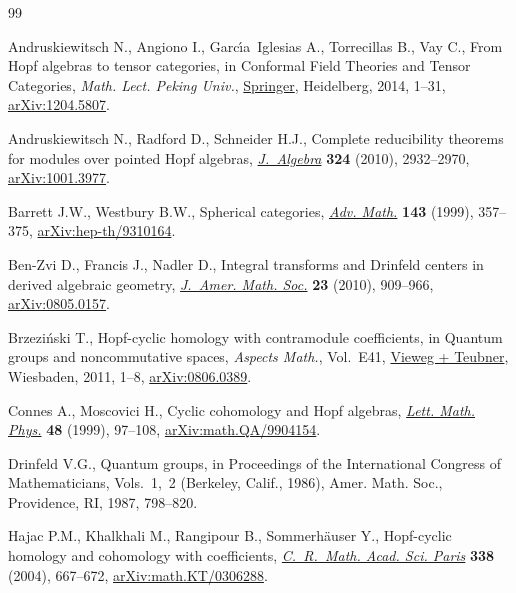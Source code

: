 \begin{thebibliography}{99}
\footnotesize\itemsep=0pt

Andruskiewitsch N., Angiono I., Garc\'{\i}a~Iglesias A., Torrecillas B., Vay
 C., From {H}opf algebras to tensor ca\-te\-gories, in Conformal Field Theories
 and Tensor Categories, \textit{Math. Lect. Peking Univ.}, \href{https://doi.org/10.1007/978-3-642-39383-9_1}{Springer}, Heidelberg, 2014,
 1--31, \href{https://arxiv.org/abs/1204.5807}{arXiv:1204.5807}.

Andruskiewitsch N., Radford D., Schneider H.J., Complete reducibility theorems
 for modules over pointed {H}opf algebras, \href{https://doi.org/10.1016/j.jalgebra.2010.06.002}{\textit{J.~Algebra}} \textbf{324}
 (2010), 2932--2970, \href{https://arxiv.org/abs/1001.3977}{arXiv:1001.3977}.

Barrett J.W., Westbury B.W., Spherical categories, \href{https://doi.org/10.1006/aima.1998.1800}{\textit{Adv. Math.}}
 \textbf{143} (1999), 357--375, \href{https://arxiv.org/abs/hep-th/9310164}{arXiv:hep-th/9310164}.

Ben-Zvi D., Francis J., Nadler D., Integral transforms and {D}rinfeld centers
 in derived algebraic geometry, \href{https://doi.org/10.1090/S0894-0347-10-00669-7}{\textit{J.~Amer. Math. Soc.}} \textbf{23}
 (2010), 909--966, \href{https://arxiv.org/abs/0805.0157}{arXiv:0805.0157}.

Brzezi\'nski T., Hopf-cyclic homology with contramodule coefficients, in
 Quantum groups and noncommutative spaces, \textit{Aspects Math.}, Vol.~E41,
 \href{https://doi.org/10.1007/978-3-8348-9831-9_1}{Vieweg + Teubner}, Wiesbaden, 2011, 1--8, \href{https://arxiv.org/abs/0806.0389}{arXiv:0806.0389}.

Connes A., Moscovici H., Cyclic cohomology and {H}opf algebras, \href{https://doi.org/10.1023/A:1007527510226}{\textit{Lett.
 Math. Phys.}} \textbf{48} (1999), 97--108, \href{https://arxiv.org/abs/math.QA/9904154}{arXiv:math.QA/9904154}.

Drinfeld V.G., Quantum groups, in Proceedings of the {I}nternational {C}ongress
 of {M}athematicians, {V}ols.~1,~2 ({B}erkeley, {C}alif., 1986), Amer. Math.
 Soc., Providence, RI, 1987, 798--820.

Hajac P.M., Khalkhali M., Rangipour B., Sommerh\"auser Y., Hopf-cyclic homology
 and cohomology with coefficients, \href{https://doi.org/10.1016/j.crma.2003.11.036}{\textit{C.~R.~Math. Acad. Sci. Paris}}
 \textbf{338} (2004), 667--672, \href{https://arxiv.org/abs/math.KT/0306288}{arXiv:math.KT/0306288}.


\end{thebibliography}

